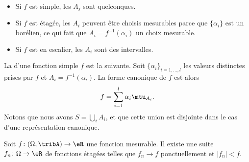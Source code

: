 \begin{itemize}
    \item Si \( f\) est  simple, les \( A_j\) sont quelconques.
    \item Si \( f\) est étagée, les \( A_i\) peuvent être choisis mesurables parce que \( \{\alpha_i \}\) est un borélien, ce qui fait que \( A_i=f^{-1}(\alpha_i)\) un choix mesurable.
    \item Si \( f\) est en escalier, les \( A_i\) sont des intervalles.
\end{itemize}

La  d'une fonction simple \( f\) est la suivante. Soit \( \{ \alpha_i \}_{i=1,\ldots, l}\) les valeurs distinctes prises par \( f\) et \( A_i=f^{-1}(\alpha_i)\). La forme canonique de \( f\) est alors
\begin{equation}
    f=\sum_{i=1}^l\alpha_i\mtu_{A_i}.
\end{equation}
Notons que nous avons \( S=\bigcup_iA_i\), et que cette union est disjointe dans le cas d'une représentation canonique.

\begin{lemma}    \label{LemYFoWqmS}
    Soit \( f\colon (\Omega,\tribA)\to \eR\) une fonction mesurable. Il existe une suite \( f_n\colon \Omega\to \eR\) de fonctions étagées telles que \( f_n\to f\) ponctuellement et \( | f_n |<f\).
\end{lemma}

